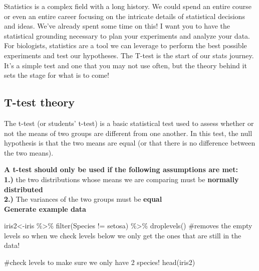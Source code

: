\documentclass[
  letterpaper,
  DIV=11,
  numbers=noendperiod]{scrartcl}
\newenvironment{Shaded}{\begin{snugshade}}{\end{snugshade}}
\newcommand{\CommentTok}[1]{\textcolor[rgb]{0.37,0.37,0.37}{#1}}
\newcommand{\FunctionTok}[1]{\textcolor[rgb]{0.28,0.35,0.67}{#1}}
\newcommand{\NormalTok}[1]{\textcolor[rgb]{0.00,0.23,0.31}{#1}}
\newcommand{\OtherTok}[1]{\textcolor[rgb]{0.00,0.23,0.31}{#1}}
\newcommand{\SpecialCharTok}[1]{\textcolor[rgb]{0.37,0.37,0.37}{#1}}
\newcommand{\StringTok}[1]{\textcolor[rgb]{0.13,0.47,0.30}{#1}}
\begin{document}
Statistics is a complex field with a long history. We could spend an
entire course or even an entire career focusing on the intricate details
of statistical decisions and ideas. We've already spent some time on
this! I want you to have the statistical grounding necessary to plan
your experiments and analyze your data. For biologists, statistics are a
tool we can leverage to perform the best possible experiments and test
our hypotheses. The T-test is the start of our stats journey. It's a
simple test and one that you may not use often, but the theory behind it
sets the stage for what is to come!

\hfill\break

\hypertarget{t-test-theory}{%
\subsection{\texorpdfstring{\textbf{T-test
theory}}{T-test theory}}\label{t-test-theory}}

The t-test (or students' t-test) is a basic statistical test used to
assess whether or not the means of two groups are different from one
another. In this test, the null hypothesis is that the two means are
equal (or that there is no difference between the two means).

\textbf{A t-test should only be used if the following assumptions are
met:}\\
\textbf{1.)} the two distributions whose means we are comparing must be
\textbf{normally distributed}\\
\textbf{2.)} The variances of the two groups must be \textbf{equal}\\

\textbf{Generate example data}

\begin{Shaded}
\begin{Highlighting}[]
\NormalTok{iris2}\OtherTok{\textless{}{-}}\NormalTok{iris }\SpecialCharTok{\%\textgreater{}\%}
  \FunctionTok{filter}\NormalTok{(Species }\SpecialCharTok{!=} \StringTok{\textquotesingle{}setosa\textquotesingle{}}\NormalTok{) }\SpecialCharTok{\%\textgreater{}\%}
  \FunctionTok{droplevels}\NormalTok{() }\CommentTok{\#removes the empty levels so when we check levels below we only get the ones that are still in the data!}

\CommentTok{\#check levels to make sure we only have 2 species!}
\FunctionTok{head}\NormalTok{(iris2)}
\end{Highlighting}
\end{Shaded}
\end{document}
